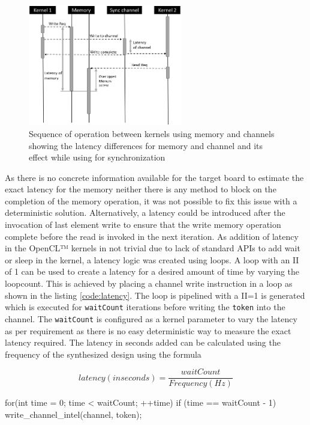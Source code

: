 \begin{figure}[ht]%
    \centering
    \includegraphics[width=0.6\textwidth]{images/memchan_latency}
    \caption{Sequence of operation between kernels using memory and channels showing
    the latency differences for memory and channel and its effect while using
    for synchronization}
    \label{fig:memchan_latency}
\end{figure}

As there is no concrete information available for the target board to estimate
the exact latency for the memory neither there is any method to block on the
completion of the memory operation, it was not possible to fix this issue with
a deterministic solution. Alternatively, a latency could be introduced after the
invocation of last element write to ensure that the write memory operation complete before
the read is invoked in the next iteration. As addition of latency in the OpenCL™
kernels in not trivial due to lack of standard APIs to add wait or sleep in the kernel,
a latency logic was created using loops. A loop with an \ac{II}
of 1 can be used to create a latency for a desired amount of time by varying the
loopcount. This is achieved by placing a channel write instruction in a loop
as shown in the listing \ref{code:latency}. The loop is pipelined with a II=1
is generated which is executed for \texttt{waitCount} iterations before writing
the \texttt{token} into the channel. The \texttt{waitCount} is configured as a kernel
parameter to vary the latency as per requirement as there is no easy deterministic way to measure
the exact latency required. The latency in seconds added can be calculated using the
frequency of the synthesized design using the formula

$$ latency(in seconds) = \frac{waitCount}{Frequency(Hz)} $$

\begin{CppCode}[caption=Loop structure used to add latency in the kernels, frame=tlrb, label=code:latency]
for(int time = 0; time < waitCount; ++time)
{
    if (time == waitCount - 1)
    {
        write_channel_intel(channel, token);
    }
}
\end{CppCode}


